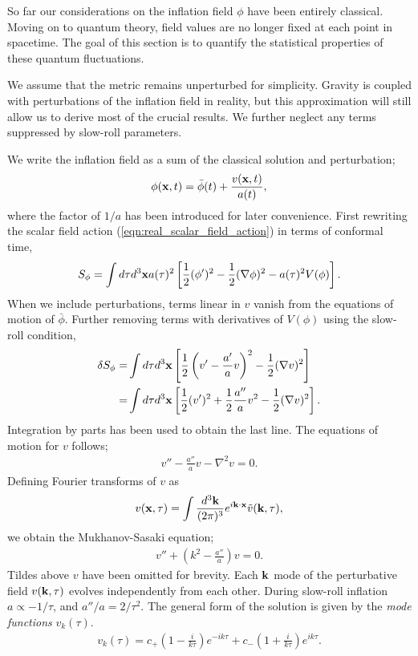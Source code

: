 So far our considerations on the inflation field $\phi$ have been entirely classical. Moving on to quantum theory, field values are no longer fixed at each point in spacetime. The goal of this section is to quantify the statistical properties of these quantum fluctuations.

We assume that the metric remains unperturbed for simplicity. Gravity is coupled with perturbations of the inflation field in reality, but this approximation will still allow us to derive most of the crucial results. We further neglect any terms suppressed by slow-roll parameters.

We write the inflation field as a sum of the classical solution and perturbation;
\begin{align}
	\phi(\mathbf{x}, t) = \bar{\phi}(t) + \frac{v(\mathbf{x}, t)}{a(t)},	\label{eqn:inflation_perturbation_definition}
\end{align}
where the factor of $1/a$ has been introduced for later convenience. First rewriting the scalar field action (\ref{eqn:real_scalar_field_action}) in terms of conformal time,
\begin{align}
	S_\phi = \int d\tau d^3\mathbf{x} a(\tau)^2 \left[ \frac{1}{2} (\phi')^2 - \frac{1}{2}(\nabla\phi)^2 - a(\tau)^2 V(\phi) \right].
\end{align}
When we include perturbations, terms linear in $v$ vanish from the equations of motion of $\bar\phi$. Further removing terms with derivatives of $V(\phi)$ using the slow-roll condition,
\begin{align}
	\delta S_\phi =& \int d\tau d^3\mathbf{x} \left[ \frac{1}{2} \left(v' - \frac{a'}{a}v \right)^2 - \frac{1}{2}(\nabla v)^2 \right]	\\
	=& \int d\tau d^3\mathbf{x} \left[ \frac{1}{2} (v')^2 + \frac{1}{2}\frac{a''}{a} v^2 - \frac{1}{2}(\nabla v)^2 \right].
\end{align}
Integration by parts has been used to obtain the last line. The equations of motion for $v$ follows;
\begin{align}
	v'' - \frac{a''}{a} v - \nabla^2 v = 0.
\end{align}
Defining Fourier transforms of $v$ as
\begin{align}
	v(\mathbf{x},\tau) = \int \frac{d^3 \mathbf{k}}{(2\pi)^3} e^{i\mathbf{k} \cdot \mathbf{x}} \tilde{v}(\mathbf{k},\tau),
\end{align}
we obtain the Mukhanov-Sasaki equation;
\begin{align}
	v'' + (k^2 - \frac{a''}{a})v = 0.	\label{eqn:Mukhanov_Sasaki}
\end{align}
Tildes above $v$ have been omitted for brevity. Each $\mathbf{k}$ mode of the perturbative field $v(\mathbf{k},\tau)$ evolves independently from each other. During slow-roll inflation $a\propto-1/\tau$, and $a''/a = 2/\tau^2$. The general form of the solution is given by the \textit{mode functions} $v_k(\tau)$.
\begin{align}
	v_k(\tau) = c_+ \left( 1 - \frac{i}{k\tau} \right) e^{-ik\tau} + c_- \left( 1 + \frac{i}{k\tau} \right) e^{ik\tau}.
\end{align}

